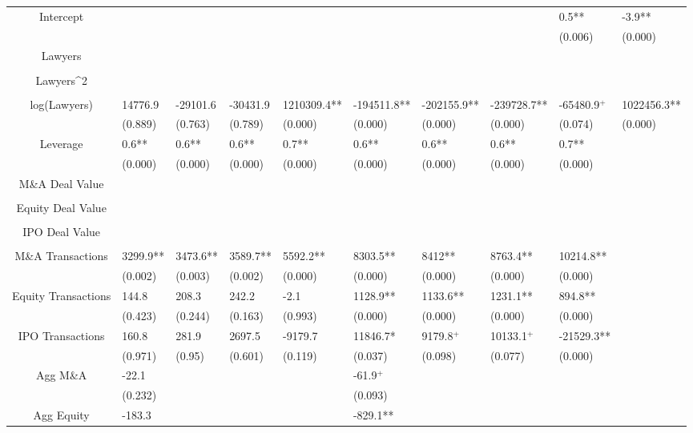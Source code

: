 \documentclass{article}
\begin{document}
\begin{table}[H]
\begin{tabular}{|clllllllll|}
Intercept &  &  &  &  &  &  &  & 0.5** & -3.9** \\ 
   &  &  &  &  &  &  &  & (0.006) & (0.000) \\ 
  Lawyers &  &  &  &  &  &  &  &  &  \\ 
   &  &  &  &  &  &  &  &  &  \\ 
  Lawyers^2 &  &  &  &  &  &  &  &  &  \\ 
   &  &  &  &  &  &  &  &  &  \\ 
  log(Lawyers) & 14776.9 & -29101.6 & -30431.9 & 1210309.4** & -194511.8** & -202155.9** & -239728.7** & -65480.9$^{+}$ & 1022456.3** \\ 
   & (0.889) & (0.763) & (0.789) & (0.000) & (0.000) & (0.000) & (0.000) & (0.074) & (0.000) \\ 
  Leverage & 0.6** & 0.6** & 0.6** & 0.7** & 0.6** & 0.6** & 0.6** & 0.7** &  \\ 
   & (0.000) & (0.000) & (0.000) & (0.000) & (0.000) & (0.000) & (0.000) & (0.000) &  \\ 
  M\&A Deal Value &  &  &  &  &  &  &  &  &  \\ 
   &  &  &  &  &  &  &  &  &  \\ 
  Equity Deal Value &  &  &  &  &  &  &  &  &  \\ 
   &  &  &  &  &  &  &  &  &  \\ 
  IPO Deal Value &  &  &  &  &  &  &  &  &  \\ 
   &  &  &  &  &  &  &  &  &  \\ 
  M\&A Transactions & 3299.9** & 3473.6** & 3589.7** & 5592.2** & 8303.5** & 8412** & 8763.4** & 10214.8** &  \\ 
   & (0.002) & (0.003) & (0.002) & (0.000) & (0.000) & (0.000) & (0.000) & (0.000) &  \\ 
  Equity Transactions & 144.8 & 208.3 & 242.2 & -2.1 & 1128.9** & 1133.6** & 1231.1** & 894.8** &  \\ 
   & (0.423) & (0.244) & (0.163) & (0.993) & (0.000) & (0.000) & (0.000) & (0.000) &  \\ 
  IPO Transactions & 160.8 & 281.9 & 2697.5 & -9179.7 & 11846.7* & 9179.8$^{+}$ & 10133.1$^{+}$ & -21529.3** &  \\ 
   & (0.971) & (0.95) & (0.601) & (0.119) & (0.037) & (0.098) & (0.077) & (0.000) &  \\ 
  Agg M\&A & -22.1 &  &  &  & -61.9$^{+}$ &  &  &  &  \\ 
   & (0.232) &  &  &  & (0.093) &  &  &  &  \\ 
  Agg Equity & -183.3 &  &  &  & -829.1** &  &  &  &  \\ 

\end{tabular}
\end{table}
\end{document}
